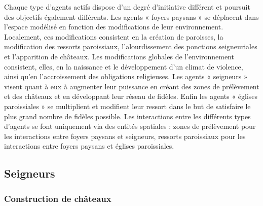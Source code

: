 \documentclass[12pt, a4paper, oneside]{book}
\begin{document}
	Chaque type d'agents actifs dispose d'un degré d'initiative différent et poursuit des objectifs également différents.
	Les agents « foyers paysans » se déplacent dans l'espace modélisé en fonction des modifications de leur environnement.
	Localement, ces modifications consistent en la création de paroisses, la modification des ressorts paroissiaux, l'alourdissement des ponctions seigneuriales et l'apparition de châteaux.
	Les modifications globales de l'environnement consistent, elles, en la naissance et le développement d'un climat de violence, ainsi qu'en l'accroissement des obligations religieuses.
	Les agents « seigneurs » visent quant à eux à augmenter leur puissance en créant des zones de prélèvement et des châteaux et en développant leur réseau de fidèles.
	Enfin les agents « églises paroissiales » se multiplient et modifient leur ressort dans le but de satisfaire le plus grand nombre de fidèles possible.
	Les interactions entre les différents types d'agents se font uniquement via des entités spatiales : zones de prélèvement pour les interactions entre foyers paysans et seigneurs, ressorts paroissiaux pour les interactions entre foyers paysans et églises paroissiales.
	
	\subsection{Seigneurs}
	
	\subsubsection{Construction de châteaux}
	
\end{document}
